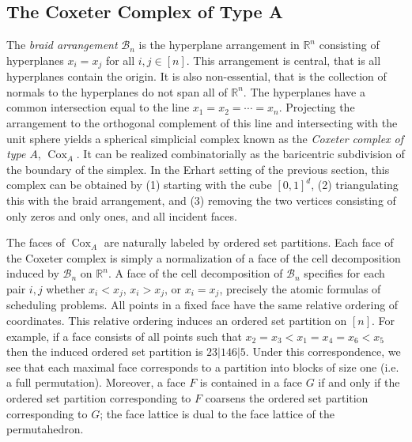 \documentclass[12pt,reqno]{amsart}
\numberwithin{definition}{section}
\theoremstyle{definition}
\newcommand{\cox}{\operatorname{Cox}}
\begin{document}
\subsection{The Coxeter Complex of Type A}
The \emph{braid arrangement} $\mathcal{B}_n$ is the hyperplane arrangement in
$\mathbb{R}^n$ consisting of hyperplanes $x_i = x_j$ for all $i,j \in [n]$.
This arrangement is central, that is all hyperplanes contain
the origin.  It is also non-essential, that is the collection of
normals to the hyperplanes do not span all of $\mathbb{R}^n$.  The
hyperplanes have a common intersection equal to the line $x_1 = x_2 = \cdots
= x_n$.  Projecting the arrangement to the orthogonal complement of
this line and intersecting with the unit sphere yields a spherical
simplicial complex known as the \emph{Coxeter complex of type $A$}, $\cox_A$.
It can be realized combinatorially as the baricentric subdivision of the
boundary of the simplex.  In the Erhart setting of the previous section, this complex
can be obtained by (1) starting with the cube $[0,1]^d$, (2) triangulating 
this with the braid arrangement, and (3) removing the two vertices consisting of 
only zeros and only ones, and all incident faces. 


The faces of $\cox_A$ are naturally  labeled by ordered
set partitions.  Each face of the Coxeter complex is simply a
normalization of a face of the cell decomposition induced by
$\mathcal{B}_n$ on $\mathbb{R}^n$.  A face of the cell decomposition of $\mathcal{B}_n$ specifies for each pair $i,j$ whether $x_i < x_j$, $x_i > x_j$, or $x_i = x_j$, precisely the atomic formulas of scheduling problems.  All points in a fixed face have
the same relative ordering of coordinates.  This relative ordering
induces an ordered set partition on $[n]$.  For example, if a face
consists of all points such that $x_2 = x_3 < x_1 =
x_4 = x_6 < x_5$ then the induced ordered set partition is
$23|146|5$.  Under this correspondence, we see that each maximal face
corresponds to a partition into blocks of size one (i.e. a full
permutation).  Moreover, a face $F$ is contained in a face $G$ if and only if
the ordered set partition corresponding to $F$ coarsens the ordered set partition
corresponding to $G$; the face lattice is dual to the face lattice of the permutahedron.
\end{document}
